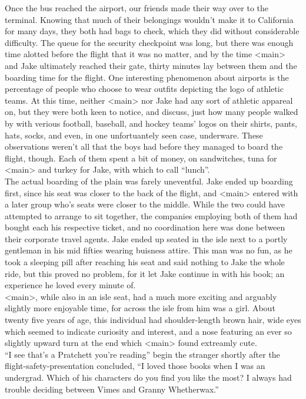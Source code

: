 \documentclass[12pt,openany]{memoir}
\begin{document}
Once the bus reached the airport, our friends made their way over to the terminal.
Knowing that much of their belongings wouldn't make it to California for many days, they both had bags to check, which they did without considerable difficulty.
The queue for the security checkpoint was long, but there was enough time alotted before the flight that it was no matter, and by the time <main> and Jake ultimately reached their gate, thirty minutes lay between them and the boarding time for the flight.
One interesting phenomenon about airports is the percentage of people who choose to wear outfits depicting the logo of athletic teams.
At this time, neither <main> nor Jake had any sort of athletic appareal on, but they were both keen to notice, and discuss, just how many people walked by with verious football, baseball, and hockey teams' logos on their shirts, pants, hats, socks, and even, in one unfortuantely seen case, underware.
These observations weren't all that the boys had before they managed to board the flight, though.
Each of them spent a bit of money, on sandwitches, tuna for <main> and turkey for Jake, with which to call ``lunch''.
\\

The actual boarding of the plain was farely uneventful.
Jake ended up boarding first, since his seat was closer to the back of the flight, and <main> entered with a later group who's seats were closer to the middle.
While the two could have attempted to arrange to sit together, the companies employing both of them had bought each his respective ticket, and no coordination here was done between their corporate travel agents.
Jake ended up seated in the isle next to a portly gentleman in his mid fifties wearing buisness attire.
This man was no fun, as he took a sleeping pill after reaching his seat and said nothing to Jake the whole ride, but this proved no problem, for it let Jake continue in with his book; an experience he loved every minute of.
\\

<main>, while also in an isle seat, had a much more exciting and arguably slightly more enjoyable time, for across the isle from him was a girl.
About twenty five years of age, this individual had shoulder-length brown hair, wide eyes which seemed to indicate curiosity and interest, and a nose featuring an ever so slightly upward turn at the end which <main> found extreamly cute.
\\

``I see that's a Pratchett you're reading'' begin the stranger shortly after the flight-safety-presentation concluded, ``I loved those books when I was an undergrad.
Which of his characters do you find you like the most?
I always had trouble deciding between Vimes and Granny Whetherwax.''
\\
\end{document}
